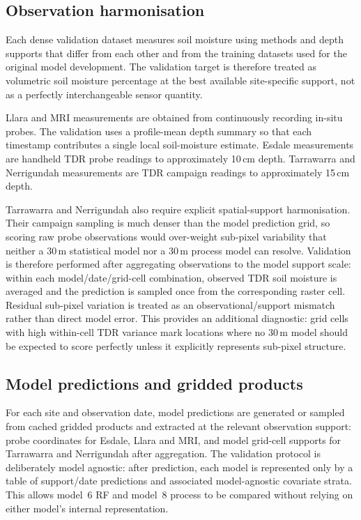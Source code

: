 \documentclass[11pt,a4paper]{article}
\newcommand{\modelSix}{model~6 RF}
\newcommand{\modelEight}{model~8 process}
\begin{document}
\subsection{Observation harmonisation}\label{sec:obs-harmonisation}

Each dense validation dataset measures soil moisture using methods and depth
supports that differ from each other and from the training datasets used for
the original model development.  The validation target is therefore treated as
volumetric soil moisture percentage at the best available site-specific support,
not as a perfectly interchangeable sensor quantity.

Llara and MRI measurements are obtained from continuously recording in-situ
probes.  The validation uses a profile-mean depth summary so that each
timestamp contributes a single local soil-moisture estimate.  Esdale
measurements are handheld TDR probe readings to approximately 10\,cm depth.
Tarrawarra and Nerrigundah measurements are TDR campaign readings to
approximately 15\,cm depth.

Tarrawarra and Nerrigundah also require explicit spatial-support
harmonisation.  Their campaign sampling is much denser than the model
prediction grid, so scoring raw probe observations would over-weight sub-pixel
variability that neither a 30\,m statistical model nor a 30\,m process model
can resolve.  Validation is therefore performed after aggregating observations
to the model support scale: within each model/date/grid-cell combination,
observed TDR soil moisture is averaged and the prediction is sampled once from
the corresponding raster cell.  Residual sub-pixel variation is treated as an
observational/support mismatch rather than direct model error.  This provides
an additional diagnostic: grid cells with high within-cell TDR variance mark
locations where no 30\,m model should be expected to score perfectly unless it
explicitly represents sub-pixel structure.

\subsection{Model predictions and gridded products}\label{sec:model-products}

For each site and observation date, model predictions are generated or sampled
from cached gridded products and extracted at the relevant observation support:
probe coordinates for Esdale, Llara and MRI, and model grid-cell supports for
Tarrawarra and Nerrigundah after aggregation.
The validation protocol is deliberately model agnostic: after prediction,
each model is represented only by a table of support/date predictions and
associated model-agnostic covariate strata.  This allows \modelSix{} and \modelEight{} to be
compared without relying on either model's internal representation.
\end{document}
